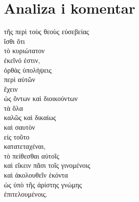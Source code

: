 \section*{Analiza i komentar}


{\large
\begin{greek}
\noindent τῆς περὶ τοὺς θεοὺς εὐσεβείας \\
ἴσθι ὅτι \\
\tabto{2em} τὸ κυριώτατον \\
\tabto{2em} ἐκεῖνό ἐστιν, \\
\tabto{4em} ὀρθὰς ὑπολήψεις \\
\tabto{6em} περὶ αὐτῶν \\
\tabto{4em} ἔχειν \\
\tabto{6em} ὡς ὄντων καὶ διοικούντων \\
\tabto{8em} τὰ ὅλα \\
\tabto{6em} καλῶς καὶ δικαίως \\
\tabto{4em} καὶ σαυτὸν \\
\tabto{6em} εἰς τοῦτο \\
\tabto{4em} κατατεταχέναι, \\
\tabto{4em} τὸ πείθεσθαι αὐτοῖς \\
\tabto{4em} καὶ εἴκειν πᾶσι τοῖς γινομένοις \\
\tabto{4em} καὶ ἀκολουθεῖν ἑκόντα \\
\tabto{6em} ὡς ὑπὸ τῆς ἀρίστης γνώμης \\
\tabto{4em} ἐπιτελουμένοις. \\

\end{greek}
}

